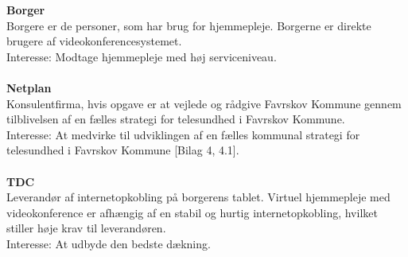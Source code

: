\documentclass[10pt,a4paper]{article}
\begin{document}
	\textbf{Borger}\\
	Borgere er de personer, som har brug for hjemmepleje. Borgerne er direkte brugere af videokonferencesystemet.\\
	Interesse: Modtage hjemmepleje med høj serviceniveau.\\ \\
	\textbf{Netplan}\\
	Konsulentfirma\cite{netplan}, hvis opgave er at vejlede og rådgive Favrskov Kommune gennem tilblivelsen af en fælles strategi for telesundhed i Favrskov Kommune.\\
	Interesse: At medvirke til udviklingen af en fælles kommunal strategi for telesundhed i Favrskov Kommune [Bilag 4, 4.1].\\ \\
	\textbf{TDC}\\
	Leverandør af internetopkobling på borgerens tablet. Virtuel hjemmepleje med videokonference er afhængig af en stabil og hurtig internetopkobling, hvilket stiller høje krav til leverandøren. \\
	Interesse: At udbyde den bedste dækning.
	\printbibliography[title=Referencer]
\end{document}

